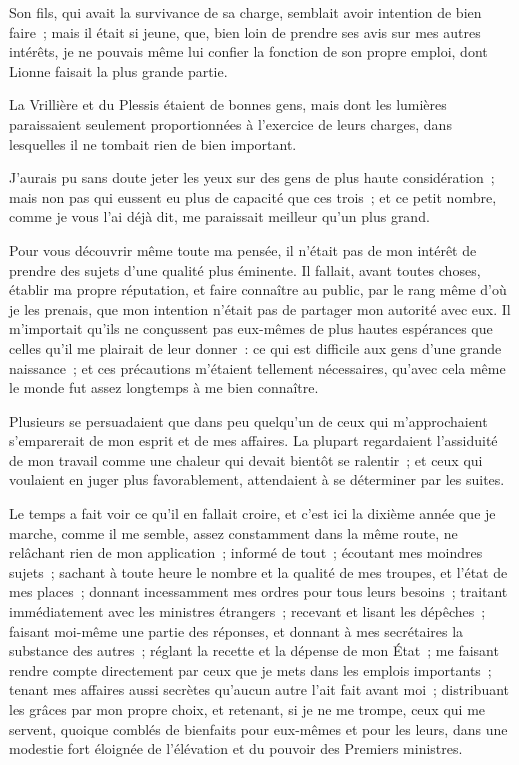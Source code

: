 \documentclass[french,twoside]{book} %
\begin{document}
Son fils, qui avait la survivance de sa charge, semblait avoir intention de bien faire ; mais il était si jeune, que, bien loin de prendre ses avis sur mes autres intérêts, je ne pouvais même lui confier la fonction de son propre emploi, dont Lionne faisait la plus grande partie.\par
La Vrillière et du Plessis étaient de bonnes gens, mais dont les lumières paraissaient seulement proportionnées à l’exercice de leurs charges, dans lesquelles il ne tombait rien de bien important.\par
J’aurais pu sans doute jeter les yeux sur des gens de plus haute considération ; mais non pas qui eussent eu plus de capacité que ces trois ; et ce petit nombre, comme je vous l’ai déjà dit, me paraissait meilleur qu’un plus grand.\par
Pour vous découvrir même toute ma pensée, il n’était pas de mon intérêt de prendre des sujets d’une qualité plus éminente. Il fallait, avant toutes choses, établir ma propre réputation, et faire connaître au public, par le rang même d’où je les prenais, que mon intention n’était pas de partager mon autorité avec eux. Il m’importait qu’ils ne conçussent pas eux-mêmes de plus hautes espérances que celles qu’il me plairait de leur donner : ce qui est difficile aux gens d’une grande naissance ; et ces précautions m’étaient tellement nécessaires, qu’avec cela même le monde fut assez longtemps à me bien connaître.\par
Plusieurs se persuadaient que dans peu quelqu’un de ceux qui m’approchaient s’emparerait de mon esprit et de mes affaires. La plupart regardaient l’assiduité de mon travail comme une chaleur qui devait bientôt se ralentir ; et ceux qui voulaient en juger plus favorablement, attendaient à se déterminer par les suites.\par
Le temps a fait voir ce qu’il en fallait croire, et c’est ici la dixième année que je marche, comme il me semble, assez constamment dans la même route, ne relâchant rien de mon application ; informé de tout ; écoutant mes moindres sujets ; sachant à toute heure le nombre et la qualité de mes troupes, et l’état de mes places ; donnant incessamment mes ordres pour tous leurs besoins ; traitant immédiatement avec les ministres étrangers ; recevant et lisant les dépêches ; faisant moi-même une partie des réponses, et donnant à mes secrétaires la substance des autres ; réglant la recette et la dépense de mon État ; me faisant rendre compte directement par ceux que je mets dans les emplois importants ; tenant mes affaires aussi secrètes qu’aucun autre l’ait fait avant moi ; distribuant les grâces par mon propre choix, et retenant, si je ne me trompe, ceux qui me servent, quoique comblés de bienfaits pour eux-mêmes et pour les leurs, dans une modestie fort éloignée de l’élévation et du pouvoir des Premiers ministres.\par
\end{document}
